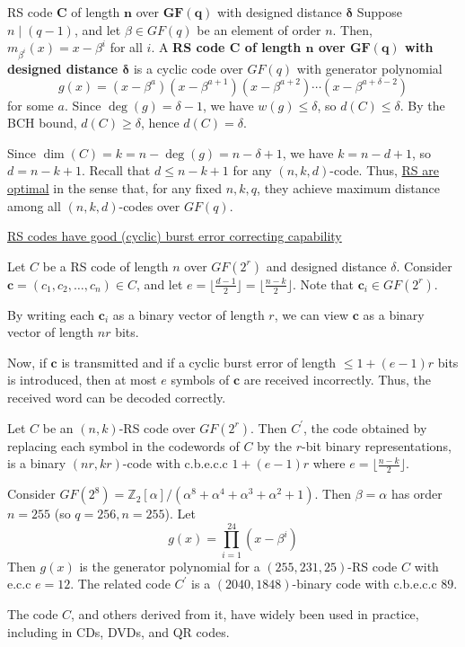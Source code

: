 \begin{Definition}{RS code $ \symbf{C} $ of length $ \symbf{n} $ over $ \symbf{GF(q)} $
        with designed distance $ \symbf{\delta} $}{}
    Suppose $ n\mid (q-1) $, and let $ \beta\in GF(q) $ be an element of order $ n $.
    Then, $ m_{\beta^i}(x)=x-\beta^i $ for all $ i $. A
    \textbf{RS code $ \symbf{C} $ of length $ \symbf{n} $ over $ \symbf{GF(q)} $
        with designed distance $ \symbf{\delta} $} is a cyclic code over $ GF(q) $
    with generator polynomial
    \[ g(x)=(x-\beta^{a})(x-\beta^{a+1})(x-\beta^{a+2})\cdots
        (x-\beta^{a+\delta-2}) \]
    for some $ a $. Since $ \deg(g)=\delta-1 $, we have $ w(g)\leqslant \delta $,
    so $ d(C)\leqslant \delta $. By the BCH bound, $ d(C)\geqslant \delta $,
    hence $ d(C)=\delta $.

    Since $ \dim(C)=k=n-\deg(g)=n-\delta+1 $, we have $ k=n-d+1 $,
    so $ d=n-k+1 $. Recall that $ d\leqslant n-k+1 $ for any $ (n,k,d) $-code.
    Thus, \underline{RS are optimal} in the sense that, for any fixed $ n,k,q $,
    they achieve maximum distance among all $ (n,k,d) $-codes over $ GF(q) $.
\end{Definition}

\underline{RS codes have good (cyclic) burst error correcting capability}

Let $ C $ be a RS code of length $ n $ over $ GF(2^r) $ and designed
distance $ \delta $. Consider $ \symbf{c}=(c_1,c_2,\ldots ,c_n)\in C $,
and let $ e=\lfloor\frac{d-1}{2} \rfloor =\lfloor\frac{n-k}{2} \rfloor $.
Note that $ \symbf{c}_i\in GF(2^r) $.

By writing each $ \symbf{c}_i $ as a binary vector of length
$ r $, we can view $ \symbf{c} $ as a binary vector of length $ nr $ bits.

Now, if $ \symbf{c} $ is transmitted and if a cyclic burst error of length
$ \leqslant 1+(e-1)r $ bits is introduced, then at most $ e $
symbols of $ \symbf{c} $ are received incorrectly. Thus, the received
word can be decoded correctly.

\begin{Theorem}{}{}
    Let $ C $ be an $ (n,k) $-RS code over $ GF(2^r) $. Then
    $ C^{\prime} $, the code obtained by replacing each symbol
    in the codewords of $ C $ by the $ r $-bit binary representations,
    is a binary $ (nr,kr) $-code with c.b.e.c.c $ 1+(e-1)r $
    where $ e=\lfloor \frac{n-k}{2} \rfloor $.
\end{Theorem}

\begin{Example}{}{}
    Consider $ GF(2^8)=\mathbb{Z}_2[\alpha]/(\alpha^8+\alpha^4+\alpha^3+\alpha^2+1) $.
    Then $ \beta=\alpha $ has order $ n=255 $ (so $ q=256,n=255 $).
    Let
    \[ g(x)=\prod_{i=1}^{24}(x-\beta^i) \]
    Then $ g(x) $ is the generator polynomial for a $ (255,231,25) $-RS
    code $ C $ with e.c.c $ e=12 $. The related code $ C^{\prime} $
    is a $ (2040,1848) $-binary code with c.b.e.c.c $ 89 $.
\end{Example}

The code $ C $, and others derived from it, have widely been used in practice,
including in CDs, DVDs, and QR codes.
